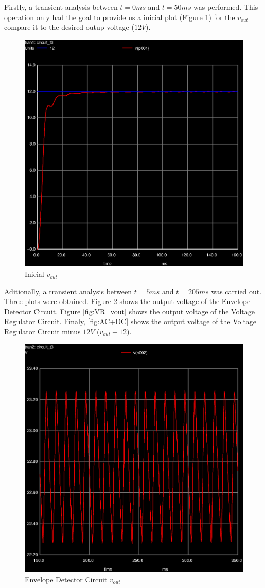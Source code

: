 Firstly, a transient analysis between $t=0ms$ and $t=50ms$ was performed. This operation
only had the goal to provide us a inicial plot (Figure \ref{fig:graph_global}) for the
$v_{out}$ compare it to the desired outup voltage ($12V$).

\begin{figure}[ht]
	\centering
	\includegraphics[width=0.5\linewidth]{trans-vout_vr_all.eps}
	\caption{Inicial $v_{out}$}
\label{fig:graph_global}
\end{figure}


Aditionally, a transient analysis between $t=5ms$ and $t=205ms$ was carried out. Three plots
were obtained. Figure \ref{fig:EV_vout} shows the output voltage of the Envelope Detector
Circuit. Figure \ref{fig:VR_vout} shows the output voltage of the Voltage Regulator Circuit.
Finaly, \ref{fig:AC+DC} shows the output voltage of the Voltage Regulator Circuit minus $12V$
($v_{out}-12$).


\begin{figure}[ht]
	\centering
	\includegraphics[width=0.6\linewidth]{trans-vout_ed.eps}
	\caption{Envelope Detector Circuit $v_{out}$}
\label{fig:EV_vout}
\end{figure}

